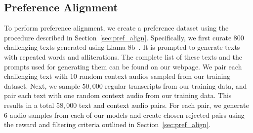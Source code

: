 \subsection{Preference Alignment}
To perform preference alignment, we create a preference dataset using the procedure described in Section~\ref{sec:pref_align}. 
Specifically, we first curate $800$ challenging texts generated using Llama-8b~\cite{touvron2023llama}. It is prompted to generate texts with repeated words and alliterations. The complete list of these texts and the prompts used for generating them can be found on our webpage. We pair each challenging text with $10$ random context audios sampled from our training dataset. Next, we sample $50{,}000$ regular transcripts from our training data, and pair each text with one random context audio from our training data. This results in a total $58{,}000$ text and context audio pairs. For each pair, we generate $6$ audio samples from each of our models and create chosen-rejected pairs using the reward and filtering criteria outlined in Section~\ref{sec:pref_align}.




